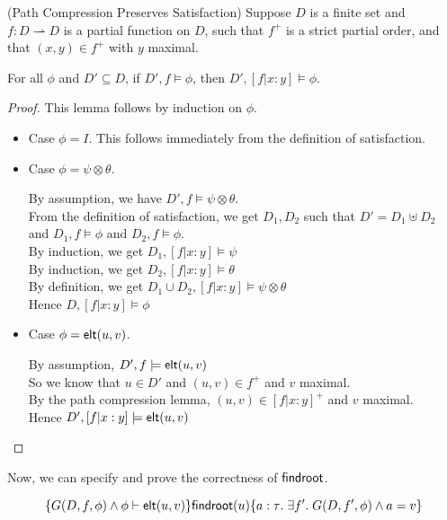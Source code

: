 \begin{lemma}{(Path Compression Preserves Satisfaction)}
Suppose $D$ is a finite set and $f : D \rightharpoonup D$ is a partial function on $D$,
such that $f^{+}$ is a strict partial order, and that $(x,y) \in f^{+}$ with $y$ maximal.

For all $\phi$ and $D' \subseteq D$, if $D', f \models \phi$, then $D', [f|x:y] \models \phi$.  
\end{lemma}

\begin{proof}
This lemma follows by induction on $\phi$. 
\begin{itemize}
\item Case $\phi = I$. This follows immediately from the definition of satisfaction. 
\item Case $\phi = \psi \otimes \theta$. 
  \begin{tabbedproof}
    \oo By assumption, we have $D', f \models \psi \otimes \theta$. \\
    \ooo From the definition of satisfaction, we get  $D_1, D_2$ such that $D' = D_1 \uplus D_2$ \\
    \oox and $D_1, f \models \phi$ and $D_2, f \models \phi$.  \\
    \ooo By induction, we get $D_1, [f|x:y] \models \psi$ \\
    \ooo By induction, we get $D_2, [f|x:y] \models \theta$ \\
    \ooo By definition, we get $D_1 \cup D_2, [f|x:y] \models \psi \otimes \theta$ \\
    \ooo Hence $D, [f|x:y] \models \phi$ \\
  \end{tabbedproof}
\item Case $\phi = \mathsf{elt}({u}, {v})$.
  \begin{tabbedproof}
    \oo By assumption, $D', f \models \mathsf{elt}({u}, {v})$ \\
    \oo So we know that $u \in D'$ and $(u,v) \in f^+$ and $v$ maximal. \\
    \oo By the path compression lemma, $(u,v) \in [f|x:y]^+$ and $v$ maximal. \\
    \oo Hence $D', [f|x:y] \models \mathsf{elt}({u}, {v})$ 
  \end{tabbedproof}
\end{itemize}
\end{proof}


Now, we can specify and prove the correctness of $\mathsf{findroot}$. 

\begin{displaymath}
  \{{G(D, f, \phi) \land {\phi} \vdash \mathsf{elt}({u}, {v})}\}{\mathsf{findroot}(u)}\{{a:\tau}.\;{\exists f'.\; G(D, f', \phi) \land a = v}\}
\end{displaymath}



